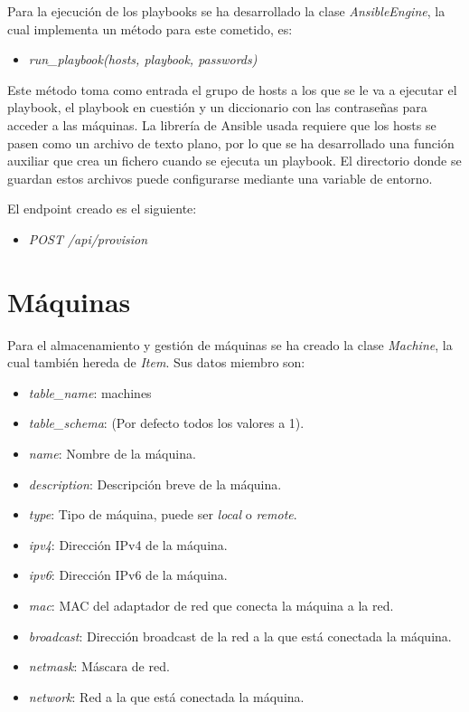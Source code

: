 \bigskip
Para la ejecución de los playbooks se ha desarrollado la clase \textit{AnsibleEngine}, la cual implementa un método para este cometido, es:
\begin{itemize}
	\item \textit{run\_playbook(hosts, playbook, passwords)}
\end{itemize}

\bigskip
Este método toma como entrada el grupo de hosts a los que se le va a ejecutar el playbook, el playbook en cuestión y un diccionario con las contraseñas para acceder a las máquinas. La librería de Ansible usada requiere que los hosts se pasen como un archivo de texto plano, por lo que se ha desarrollado una función auxiliar que crea un fichero cuando se ejecuta un playbook. El directorio donde se guardan estos archivos puede configurarse mediante una variable de entorno.



\bigskip
El endpoint creado es el siguiente:
\begin{itemize}
	\item \textit{POST /api/provision}
\end{itemize}




\section{Máquinas}

Para el almacenamiento y gestión de máquinas se ha creado la clase \textit{Machine}, la cual también hereda de \textit{Item}. Sus datos miembro son:
\begin{itemize}
	\item \textit{table\_name}: machines
	\item \textit{table\_schema}: (Por defecto todos los valores a 1).
	\item \textit{name}: Nombre de la máquina.
	\item \textit{description}: Descripción breve de la máquina.
	\item \textit{type}: Tipo de máquina, puede ser \textit{local} o \textit{remote}.
	\item \textit{ipv4}: Dirección IPv4 de la máquina.
	\item \textit{ipv6}: Dirección IPv6 de la máquina.
	\item \textit{mac}: MAC del adaptador de red que conecta la máquina a la red.
	\item \textit{broadcast}: Dirección broadcast de la red a la que está conectada la máquina.
	\item \textit{netmask}: Máscara de red.
	\item \textit{network}: Red a la que está conectada la máquina.
\end{itemize}


